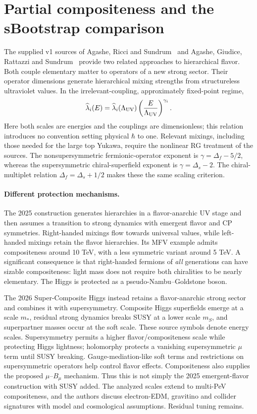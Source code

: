 \section{Partial compositeness and the sBootstrap comparison}
\label{sec:partialcomparison}
The supplied v1 sources of Agashe, Ricci and Sundrum~\cite{ARS2025}
and Agashe, Giudice, Rattazzi and Sundrum~\cite{AGRS2026} provide two
related approaches to hierarchical flavor. Both couple elementary matter
to operators of a new strong sector. Their operator dimensions generate
hierarchical mixing strengths from structureless ultraviolet values.
In the irrelevant-coupling, approximately fixed-point regime,
\begin{equation}
 \widehat\lambda_i(E)=\widehat\lambda_i(\Lambda_{\rm UV})
 \left(\frac{E}{\Lambda_{\rm UV}}\right)^{\gamma_i}.
\end{equation}
Here both scales are energies and the couplings are dimensionless;
this relation introduces no convention setting physical $\hbar$ to one.
Relevant mixings, including those needed for the large top Yukawa,
require the nonlinear RG treatment of the sources.
The nonsupersymmetric fermionic-operator exponent is
$\gamma=\Delta_f-5/2$, whereas the supersymmetric chiral-superfield
exponent is $\gamma=\Delta_s-2$. The chiral-multiplet relation
$\Delta_f=\Delta_s+1/2$ makes these the same scaling criterion.

\paragraph{Different protection mechanisms.}
The 2025 construction generates hierarchies in a flavor-anarchic UV
stage and then assumes a transition to strong dynamics with emergent
flavor and CP symmetries. Right-handed mixings flow towards universal
values, while left-handed mixings retain the flavor hierarchies.
Its MFV example admits compositeness around 10 TeV, with a less symmetric
variant around 5 TeV. A significant consequence is that right-handed
fermions of \emph{all} generations can have sizable compositeness:
light mass does not require both chiralities to be nearly elementary.
The Higgs is protected as a pseudo-Nambu--Goldstone boson.

The 2026 Super-Composite Higgs instead retains a flavor-anarchic strong
sector and combines it with supersymmetry. Composite Higgs superfields
emerge at a scale $m_*$, residual strong dynamics breaks SUSY at a lower
scale $m_S$, and superpartner masses occur at the soft scale.
These source symbols denote energy scales. Supersymmetry permits a
higher flavor/compositeness scale while protecting Higgs lightness;
holomorphy protects a vanishing supersymmetric $\mu$ term until SUSY
breaking. Gauge-mediation-like soft terms and restrictions on
supersymmetric operators help control flavor effects. Compositeness
also supplies the proposed $\mu$--$B_\mu$ mechanism.
Thus this is not simply the 2025 emergent-flavor construction with
SUSY added. The analyzed scales extend to multi-PeV compositeness,
and the authors discuss electron-EDM, gravitino and collider signatures
with model and cosmological assumptions. Residual tuning remains.

